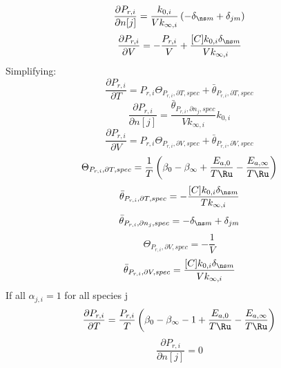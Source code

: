 \documentclass[a4paper,10pt]{article}
\begin{document}
\begin{dmath} \frac{\partial P_{r, i} }{\partial n[j] } = \frac{k_{0, i}}{V k_{\infty, i}} \left(- \delta_{\ns m} + \delta_{j m}\right)\end{dmath} 
\begin{dmath} \frac{\partial P_{r, i} }{\partial V } = - \frac{P_{r, i}}{V} + \frac{[C] k_{0, i} \delta_{\ns m}}{V k_{\infty, i}}\end{dmath} 
Simplifying:
\begin{dmath} \frac{\partial P_{r, i} }{\partial T } = P_{r, i} \Theta_{P_{r,i}, \partial T, spec} + \bar{\theta}_{P_{r, i}, \partial T, spec}\end{dmath} 
\begin{dmath} \frac{\partial P_{r, i} }{\partial n[j] } = \frac{\bar{\theta}_{P_{r, i}, \partial n_j, spec}}{V k_{\infty, i}} k_{0, i}\end{dmath} 
\begin{dmath} \frac{\partial P_{r, i} }{\partial V } = P_{r, i} \Theta_{P_{r,i}, \partial V, spec} + \bar{\theta}_{P_{r, i}, \partial V, spec}\end{dmath} 
\begin{dmath} \Theta_{P_{r,i}, \partial T, spec} = \frac{1}{T} \left(\beta_{0} - \beta_{\infty} + \frac{E_{a, 0}}{T \Ru} - \frac{E_{a, \infty}}{T \Ru}\right)\end{dmath} 
\begin{dmath} \bar{\theta}_{P_{r, i}, \partial T, spec} = - \frac{[C] k_{0, i} \delta_{\ns m}}{T k_{\infty, i}}\end{dmath} 
\begin{dmath} \bar{\theta}_{P_{r, i}, \partial n_j, spec} = - \delta_{\ns m} + \delta_{j m}\end{dmath} 
\begin{dmath} \Theta_{P_{r,i}, \partial V, spec} = - \frac{1}{V}\end{dmath} 
\begin{dmath} \bar{\theta}_{P_{r, i}, \partial V, spec} = \frac{[C] k_{0, i} \delta_{\ns m}}{V k_{\infty, i}}\end{dmath} 
If all $\alpha_{j, i} = 1$ for all species j
\begin{dmath} \frac{\partial P_{r, i} }{\partial T } = \frac{P_{r, i}}{T} \left(\beta_{0} - \beta_{\infty} - 1 + \frac{E_{a, 0}}{T \Ru} - \frac{E_{a, \infty}}{T \Ru}\right)\end{dmath} 
\begin{dmath} \frac{\partial P_{r, i} }{\partial n[j] } = 0\end{dmath} 
\end{document}
